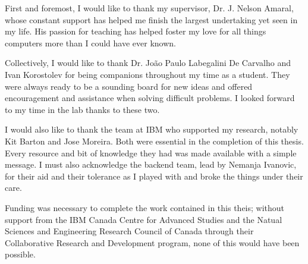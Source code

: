 \documentclass[\main/thesis.tex]{subfiles}
\begin{document}
\begin{acknowledgements}
  First and foremost, I would like to thank my supervisor, Dr. J. Nelson Amaral, whose constant support has helped me finish the largest undertaking yet seen in my life.
  His passion for teaching has helped foster my love for all things computers more than I could have ever known.

  Collectively, I would like to thank Dr. Jo\~ao Paulo Labegalini De Carvalho and Ivan Korostolev for being companions throughout my time as a student.
  They were always ready to be a sounding board for new ideas and offered encouragement and assistance when solving difficult problems.
  I looked forward to my time in the lab thanks to these two.

  I would also like to thank the team at IBM who supported my research, notably Kit Barton and Jose Moreira.
  Both were essential in the completion of this thesis.
  Every resource and bit of knowledge they had was made available with a simple message.
  I must also acknowledge the backend team, lead by Nemanja Ivanovic, for their aid and their tolerance as I played with and broke the things under their care.

  Funding was necessary to complete the work contained in this theis; without support from the IBM Canada Centre for Advanced Studies and the Natual Sciences and Engineering Research Council of Canada through their Collaborative Research and Development program, none of this would have been possible.
\end{acknowledgements}
\end{document}
